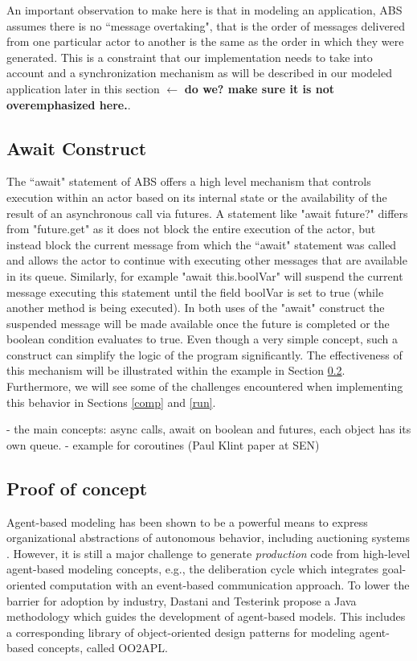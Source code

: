 An important observation to make here is that in modeling an application, ABS assumes there is no ``message overtaking", that is the order of messages delivered from one particular actor to another is the same as the order in which they were generated. 
This is a constraint that our implementation needs to take into account and a synchronization mechanism as will be described in our modeled application later in this section $\leftarrow$ {\bfseries do we? make sure it is not overemphasized here.}. 


\subsection{Await Construct}
The ``await" statement of ABS offers a high level mechanism that controls execution within an actor based on its internal state or the availability of the result of an asynchronous call via futures. A statement like "await future?" differs from "future.get" as it does not block the entire execution of the actor, but instead block the current message from which the ``await" statement was called and allows the actor to continue with executing other messages that are available in its queue. Similarly, for example "await this.boolVar" will suspend the current message executing this statement until the field boolVar is set to true (while another method is being executed). In both uses of the "await" construct the suspended message will be made available once the future is completed or the boolean condition evaluates to true. 
Even though a very simple concept, such a construct can simplify the logic of the program significantly. The effectiveness of this mechanism will be illustrated within the example in Section \ref{ag}. 
Furthermore, we will see some of the challenges encountered when implementing this behavior in Sections \ref{comp} and \ref{run}.        

- the main concepts: async calls, await on boolean and futures, each object has its own queue.
- example for coroutines (Paul Klint paper at SEN)

\subsection{Proof of concept}
\label{ag}


Agent-based modeling has been shown to be a powerful means to express organizational abstractions of autonomous behavior, including auctioning systems \cite{agent_auction,bas16}.
However, it is still a major challenge to generate  \emph{production} code from  high-level agent-based modeling concepts, e.g., the deliberation cycle which integrates  goal-oriented computation with an event-based communication approach. 
To lower the barrier for adoption by industry, Dastani and Testerink \cite{bas16} propose a Java methodology which guides the development of agent-based models. 
This includes a corresponding library of object-oriented design patterns for modeling agent-based concepts, called OO2APL. 

